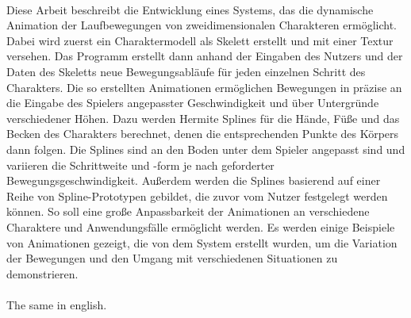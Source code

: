 \kurzfassung

\paragraph*{}
Diese Arbeit beschreibt die Entwicklung eines Systems, das die dynamische Animation der Laufbewegungen von zweidimensionalen Charakteren ermöglicht. Dabei wird zuerst ein Charaktermodell als Skelett erstellt und mit einer Textur versehen. Das Programm erstellt dann anhand der Eingaben des Nutzers und der Daten des Skeletts neue Bewegungsabläufe für jeden einzelnen Schritt des Charakters. Die so erstellten Animationen ermöglichen Bewegungen in präzise an die Eingabe des Spielers angepasster Geschwindigkeit und über Untergründe verschiedener Höhen. Dazu werden Hermite Splines für die Hände, Füße und das Becken des Charakters berechnet, denen die entsprechenden Punkte des Körpers dann folgen. Die Splines sind an den Boden unter dem Spieler angepasst sind und variieren die Schrittweite und -form je nach geforderter Bewegungsgeschwindigkeit.
Außerdem werden die Splines basierend auf einer Reihe von Spline-Prototypen gebildet, die zuvor vom Nutzer festgelegt werden können. So soll eine große Anpassbarkeit der Animationen an verschiedene Charaktere und Anwendungsfälle ermöglicht werden.
Es werden einige Beispiele von Animationen gezeigt, die von dem System erstellt wurden, um die Variation der Bewegungen und den Umgang mit verschiedenen Situationen zu demonstrieren.


\paragraph*{}
The same in english.
